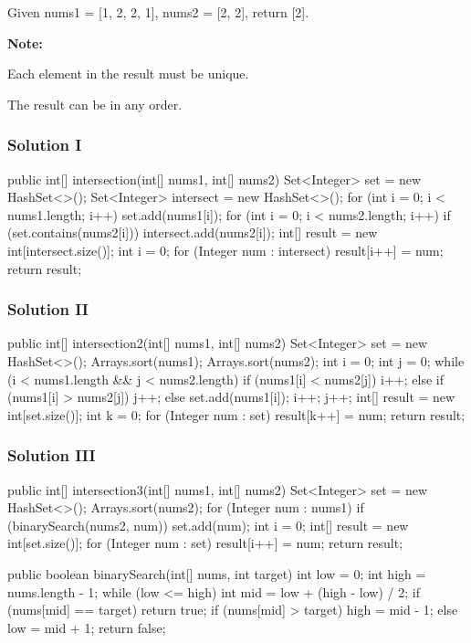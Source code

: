 Given nums1 = [1, 2, 2, 1], nums2 = [2, 2], return [2].

\textbf{Note:}

Each element in the result must be unique.

The result can be in any order.

\subsubsection{Solution I}

\begin{Code}
public int[] intersection(int[] nums1, int[] nums2) {
    Set<Integer> set = new HashSet<>();
    Set<Integer> intersect = new HashSet<>();
    for (int i = 0; i < nums1.length; i++) {
        set.add(nums1[i]);
    }
    for (int i = 0; i < nums2.length; i++) {
        if (set.contains(nums2[i])) {
            intersect.add(nums2[i]);
        }
    }
    int[] result = new int[intersect.size()];
    int i = 0;
    for (Integer num : intersect) {
        result[i++] = num;
    }
    return result;
}
\end{Code}

\subsubsection{Solution II}
\begin{Code}
public int[] intersection2(int[] nums1, int[] nums2) {
    Set<Integer> set = new HashSet<>();
    Arrays.sort(nums1);
    Arrays.sort(nums2);
    int i = 0;
    int j = 0;
    while (i < nums1.length && j < nums2.length) {
        if (nums1[i] < nums2[j]) {
            i++;
        } else if (nums1[i] > nums2[j]) {
            j++;
        } else {
            set.add(nums1[i]);
            i++;
            j++;
        }
    }
    int[] result = new int[set.size()];
    int k = 0;
    for (Integer num : set) {
        result[k++] = num;
    }
    return result;
}
\end{Code}

\subsubsection{Solution III}
\begin{Code}
public int[] intersection3(int[] nums1, int[] nums2) {
    Set<Integer> set = new HashSet<>();
    Arrays.sort(nums2);
    for (Integer num : nums1) {
        if (binarySearch(nums2, num)) {
            set.add(num);
        }
    }
    int i = 0;
    int[] result = new int[set.size()];
    for (Integer num : set) {
        result[i++] = num;
    }
    return result;
}

public boolean binarySearch(int[] nums, int target) {
    int low = 0;
    int high = nums.length - 1;
    while (low <= high) {
        int mid = low + (high - low) / 2;
        if (nums[mid] == target) {
            return true;
        }
        if (nums[mid] > target) {
            high = mid - 1;
        } else {
            low = mid + 1;
        }
    }
    return false;
}
\end{Code}


